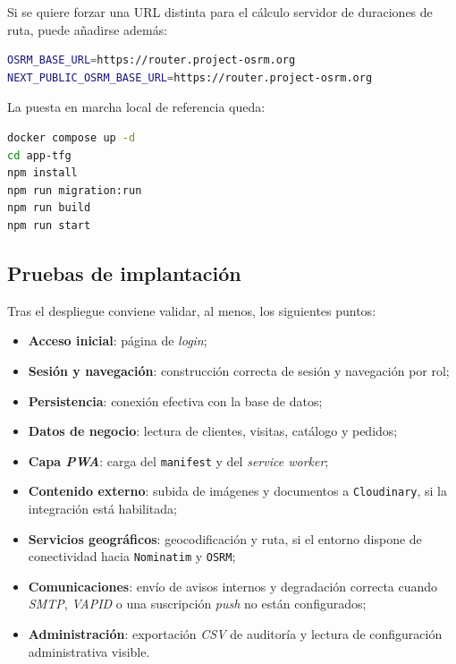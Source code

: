 Si se quiere forzar una URL distinta para el cálculo servidor de duraciones de ruta, puede añadirse además:

\begin{lstlisting}[language=bash]
OSRM_BASE_URL=https://router.project-osrm.org
NEXT_PUBLIC_OSRM_BASE_URL=https://router.project-osrm.org
\end{lstlisting}

La puesta en marcha local de referencia queda:

\begin{lstlisting}[language=bash]
docker compose up -d
cd app-tfg
npm install
npm run migration:run
npm run build
npm run start
\end{lstlisting}

\subsection{Pruebas de implantación}

Tras el despliegue conviene validar, al menos, los siguientes puntos:

\begin{itemize}
    \item \textbf{Acceso inicial}: página de \textit{login};
    \item \textbf{Sesión y navegación}: construcción correcta de sesión y navegación por rol;
    \item \textbf{Persistencia}: conexión efectiva con la base de datos;
    \item \textbf{Datos de negocio}: lectura de clientes, visitas, catálogo y pedidos;
    \item \textbf{Capa \textit{PWA}}: carga del \texttt{manifest} y del \textit{service worker};
    \item \textbf{Contenido externo}: subida de imágenes y documentos a \texttt{Cloudinary}, si la integración está habilitada;
    \item \textbf{Servicios geográficos}: geocodificación y ruta, si el entorno dispone de conectividad hacia \texttt{Nominatim} y \texttt{OSRM};
    \item \textbf{Comunicaciones}: envío de avisos internos y degradación correcta cuando \textit{SMTP}, \textit{VAPID} o una suscripción \textit{push} no están configurados;
    \item \textbf{Administración}: exportación \textit{CSV} de auditoría y lectura de configuración administrativa visible.
\end{itemize}

